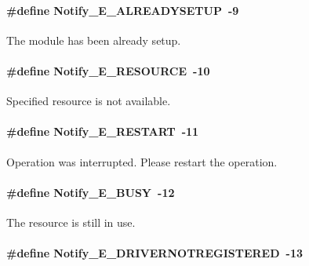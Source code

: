 \paragraph[{Notify\_\-E\_\-ALREADYSETUP}]{\setlength{\rightskip}{0pt plus 5cm}\#define Notify\_\-E\_\-ALREADYSETUP~-\/9}\hfill\label{_notify_8h_abd83fd46add74de157a57a8458c67021}


The module has been already setup. 

\paragraph[{Notify\_\-E\_\-RESOURCE}]{\setlength{\rightskip}{0pt plus 5cm}\#define Notify\_\-E\_\-RESOURCE~-\/10}\hfill\label{_notify_8h_aa4f6f673a3eb54bdcd65d1cefccb29e7}


Specified resource is not available. 

\paragraph[{Notify\_\-E\_\-RESTART}]{\setlength{\rightskip}{0pt plus 5cm}\#define Notify\_\-E\_\-RESTART~-\/11}\hfill\label{_notify_8h_a281da75d439e60a04a400bffdaf6c4f6}


Operation was interrupted. Please restart the operation. 

\paragraph[{Notify\_\-E\_\-BUSY}]{\setlength{\rightskip}{0pt plus 5cm}\#define Notify\_\-E\_\-BUSY~-\/12}\hfill\label{_notify_8h_a21bc6c23823d736fb2589664d876d942}


The resource is still in use. 

\paragraph[{Notify\_\-E\_\-DRIVERNOTREGISTERED}]{\setlength{\rightskip}{0pt plus 5cm}\#define Notify\_\-E\_\-DRIVERNOTREGISTERED~-\/13}\hfill\label{_notify_8h_a545952549555e51f9e79011dc809c07c}


